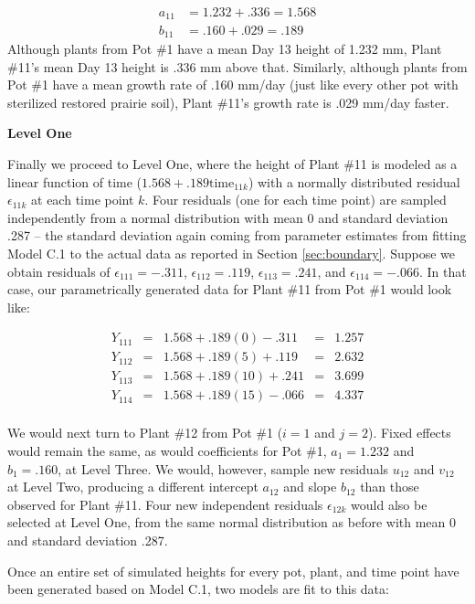 \documentclass[
]{krantz}
\begin{document}
\begin{align*}
a_{11} & = 1.232+.336 = 1.568 \\
b_{11} & = .160+.029 = .189
\end{align*}
Although plants from Pot \#1 have a mean Day 13 height of 1.232 mm, Plant \#11's mean Day 13 height is .336 mm above that. Similarly, although plants from Pot \#1 have a mean growth rate of .160 mm/day (just like every other pot with sterilized restored prairie soil), Plant \#11's growth rate is .029 mm/day faster.

\textbf{Level One}

Finally we proceed to Level One, where the height of Plant \#11 is modeled as a linear function of time (\(1.568 + .189\textrm{time}_{11k}\)) with a normally distributed residual \(\epsilon_{11k}\) at each time point \(k\). Four residuals (one for each time point) are sampled independently from a normal distribution with mean 0 and standard deviation .287 -- the standard deviation again coming from parameter estimates from fitting Model C.1 to the actual data as reported in Section \ref{sec:boundary}. Suppose we obtain residuals of \(\epsilon_{111}=-.311\), \(\epsilon_{112}=.119\), \(\epsilon_{113}=.241\), and \(\epsilon_{114}=-.066\). In that case, our parametrically generated data for Plant \#11 from Pot \#1 would look like:

\[ \begin{array}{rcccl}
   Y_{111} & = & 1.568+.189(0)-.311 & = & 1.257 \\
   Y_{112} & = & 1.568+.189(5)+.119 & = & 2.632 \\
   Y_{113} & = & 1.568+.189(10)+.241 & = & 3.699 \\
   Y_{114} & = & 1.568+.189(15)-.066 & = & 4.337 \\
   \end{array} \]

We would next turn to Plant \#12 from Pot \#1 (\(i=1\) and \(j=2\)). Fixed effects would remain the same, as would coefficients for Pot \#1, \(a_{1} = 1.232\) and \(b_{1} = .160\), at Level Three. We would, however, sample new residuals \(u_{12}\) and \(v_{12}\) at Level Two, producing a different intercept \(a_{12}\) and slope \(b_{12}\) than those observed for Plant \#11. Four new independent residuals \(\epsilon_{12k}\) would also be selected at Level One, from the same normal distribution as before with mean 0 and standard deviation .287.

Once an entire set of simulated heights for every pot, plant, and time point have been generated based on Model C.1, two models are fit to this data:
\end{document}
